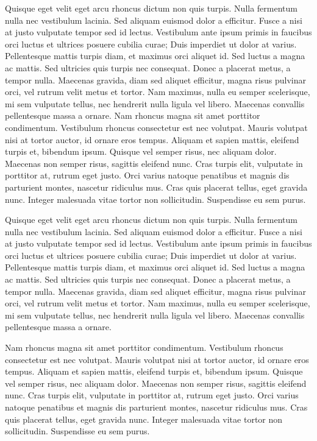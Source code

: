 \documentclass[a4paper]{article}
\begin{document}
    \begin{answer}
        Quisque eget velit eget arcu rhoncus dictum non quis turpis. Nulla fermentum nulla nec vestibulum lacinia. Sed aliquam euismod dolor a efficitur. Fusce a nisi at justo vulputate tempor sed id lectus. Vestibulum ante ipsum primis in faucibus orci luctus et ultrices posuere cubilia curae; Duis imperdiet ut dolor at varius. Pellentesque mattis turpis diam, et maximus orci aliquet id. Sed luctus a magna ac mattis. Sed ultricies quis turpis nec consequat. Donec a placerat metus, a tempor nulla. Maecenas gravida, diam sed aliquet efficitur, magna risus pulvinar orci, vel rutrum velit metus et tortor. Nam maximus, nulla eu semper scelerisque, mi sem vulputate tellus, nec hendrerit nulla ligula vel libero. Maecenas convallis pellentesque massa a ornare.
        Nam rhoncus magna sit amet porttitor condimentum. Vestibulum rhoncus
         consectetur est nec volutpat. Mauris volutpat nisi at tortor auctor, id 
         ornare eros tempus. Aliquam et sapien mattis, eleifend turpis et, bibendum ipsum. Quisque vel semper risus, nec aliquam dolor. Maecenas non semper risus, sagittis eleifend nunc. Cras turpis elit, vulputate in porttitor at, rutrum eget justo. Orci varius natoque penatibus et magnis dis parturient montes, nascetur ridiculus mus. Cras quis placerat tellus, eget gravida nunc. Integer malesuada vitae tortor non sollicitudin. Suspendisse eu sem purus.
    \end{answer}

    \begin{answer}
        Quisque eget velit eget arcu rhoncus dictum non quis turpis. Nulla fermentum nulla nec vestibulum lacinia. Sed aliquam euismod dolor a efficitur. Fusce a nisi at justo vulputate tempor sed id lectus. Vestibulum ante ipsum primis in faucibus orci luctus et ultrices posuere cubilia curae; Duis imperdiet ut dolor at varius. Pellentesque mattis turpis diam, et maximus orci aliquet id. Sed luctus a magna ac mattis. Sed ultricies quis turpis nec consequat. Donec a placerat metus, a tempor nulla. Maecenas gravida, diam sed aliquet efficitur, magna risus pulvinar orci, vel rutrum velit metus et tortor. Nam maximus, nulla eu semper scelerisque, mi sem vulputate tellus, nec hendrerit nulla ligula vel libero. Maecenas convallis pellentesque massa a ornare.

        Nam rhoncus magna sit amet porttitor condimentum. Vestibulum rhoncus consectetur est nec volutpat. Mauris volutpat nisi at tortor auctor, id ornare eros tempus. Aliquam et sapien mattis, eleifend turpis et, bibendum ipsum. Quisque vel semper risus, nec aliquam dolor. Maecenas non semper risus, sagittis eleifend nunc. Cras turpis elit, vulputate in porttitor at, rutrum eget justo. Orci varius natoque penatibus et magnis dis parturient montes, nascetur ridiculus mus. Cras quis placerat tellus, eget gravida nunc. Integer malesuada vitae tortor non sollicitudin. Suspendisse eu sem purus.
    \end{answer}
\end{document}
